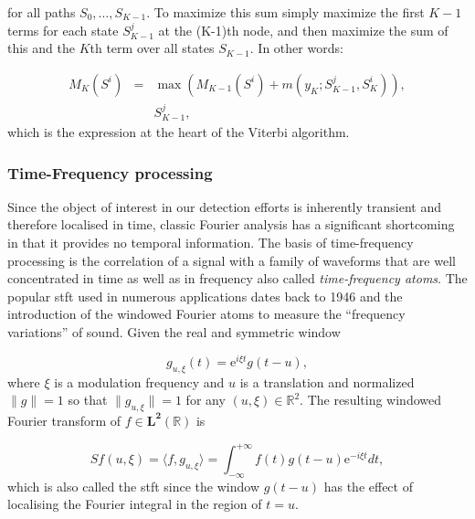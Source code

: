 for all paths $S_0,\ldots, S_{K-1}$.
To maximize this sum simply maximize the first $K-1$ terms for each state $S^j_{K-1}$ at the (K-1)th node, and then maximize the sum of this and the $K$th term over all states $S_{K-1}$. In other words:

\begin{eqnarray}\label{eq:viterbiLitRev5}
M_K(S^i) &=& \max \left( M_{K-1}(S^i) + m(y_K ; S_{K-1}^j, S_{K}^i)\right), \\ \nonumber
& & S_{K-1}^j,
\end{eqnarray}
which is the expression at the heart of the Viterbi algorithm\cite{Viterbi2006}.


\subsubsection{Time-Frequency processing}
Since the object of interest in our detection efforts is inherently transient and therefore localised in time, classic Fourier analysis has a significant shortcoming in that it provides no temporal information. The basis of time-frequency processing is the correlation of a signal with a family of waveforms that are well concentrated in time as well as in frequency\cite{Mallat1999} also called \emph{time-frequency atoms}\cite{Gabor1946}. The popular \gls{stft} used in numerous applications dates back to 1946 and the introduction of the windowed Fourier atoms to measure the ``frequency variations'' of sound. Given the real and symmetric window

\begin{equation}\label{eq:Mallat1999}
g_{u,\xi}(t) = \mathrm{e}^{i\xi t}g(t-u),
\end{equation}
where $\xi$ is a modulation frequency and $u$ is a translation and normalized $\|g\| = 1$ so that $\|g_{u,\xi}\| = 1$ for any $(u, \xi) \in \mathbb{R}^2$. The resulting windowed Fourier transform of $f \in \mathbf{L^2}(\mathbb{R})$ is

\begin{equation}\label{eq:Mallat1999_2}
S f(u, \xi) = \langle f, g_{u,\xi} \rangle = \int^{+\infty}_{-\infty}  f(t)g(t-u)\mathrm{e}^{-i\xi t} dt,
\end{equation}
which is also called the \gls{stft} since the window $g(t-u)$ has the effect of localising the Fourier integral in the region of $t=u$.

